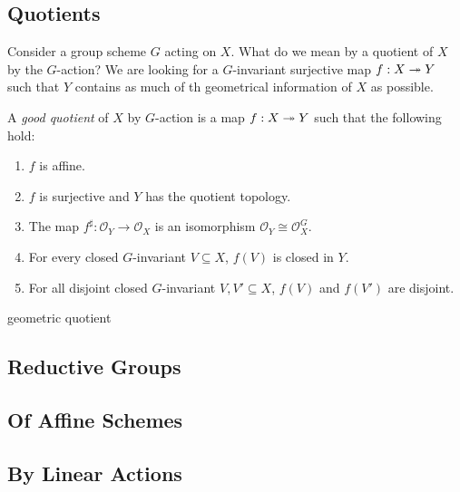 \documentclass[12pt]{ociamthesis}  %
\begin{document}
\begin{example}
  \missingexample
\end{example}

\subsection{Quotients}

Consider a group scheme $G$ acting on $X$. What do we mean by a
quotient of $X$ by the $G$-action? We are looking for a $G$-invariant
surjective map $f : X\twoheadrightarrow Y$ such that $Y$ contains as much of th
geometrical information of $X$ as possible.


\begin{definition}
  A \emph{good quotient} of $X$ by $G$-action is a map
  $f : X\twoheadrightarrow Y$ such that the following hold:
  \begin{enumerate}
    \item $f$ is affine.
    \item $f$ is surjective and $Y$ has the quotient topology.
    \item The map $f^\sharp : \mathscr O_Y \to \mathscr O_X$
          is an isomorphism $\mathscr O_Y \cong \mathscr O_X^G$.
    \item For every closed $G$-invariant $V\subseteq X$,
          $f(V)$ is closed in $Y$.
    \item For all disjoint closed $G$-invariant $V,V'\subseteq X$,
          $f(V)$ and $f(V')$ are disjoint.
  \end{enumerate}
\end{definition}

\begin{definition}
  geometric quotient
\end{definition}

\subsection{Reductive Groups}

\missingsection

\subsection{Of Affine Schemes}

\missingsection

\subsection{By Linear Actions}
\end{document}
